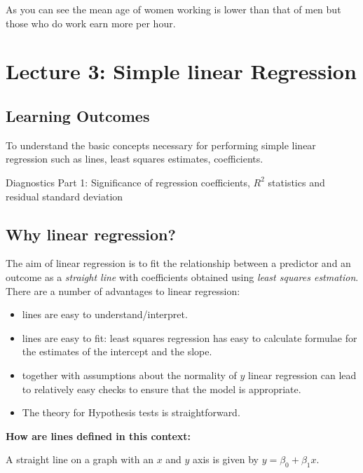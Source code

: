 \documentclass[
]{gitbook}
\providecommand{\tightlist}{%
  \setlength{\itemsep}{0pt}\setlength{\parskip}{0pt}}
\begin{document}
As you can see the mean age of women working is lower than that of men but those who do work earn more per hour.

\hypertarget{lecture-3-simple-linear-regression}{%
\section{Lecture 3: Simple linear Regression}\label{lecture-3-simple-linear-regression}}

\hypertarget{learning-outcomes-3}{%
\subsection{Learning Outcomes}\label{learning-outcomes-3}}

To understand the basic concepts necessary for performing simple linear regression such as lines, least squares estimates, coefficients.

Diagnostics Part 1: Significance of regression coefficients, \(R^2\) statistics and residual standard deviation

\hypertarget{why-linear-regression}{%
\subsection{Why linear regression?}\label{why-linear-regression}}

The aim of linear regression is to fit the relationship between a predictor and an outcome as a \emph{straight line} with coefficients obtained using \emph{least squares estmation}. There are a number of advantages to linear regression:

\begin{itemize}
\tightlist
\item
  lines are easy to understand/interpret.
\item
  lines are easy to fit: least squares regression has easy to calculate formulae for the estimates of the intercept and the slope.
\item
  together with assumptions about the normality of \(y\) linear regression can lead to relatively easy checks to ensure that the model is appropriate.
\item
  The theory for Hypothesis tests is straightforward.
\end{itemize}

\textbf{How are lines defined in this context:}

A straight line on a graph with an \(x\) and \(y\) axis is given by \(y = \beta_0+\beta_1 x\).
\end{document}
